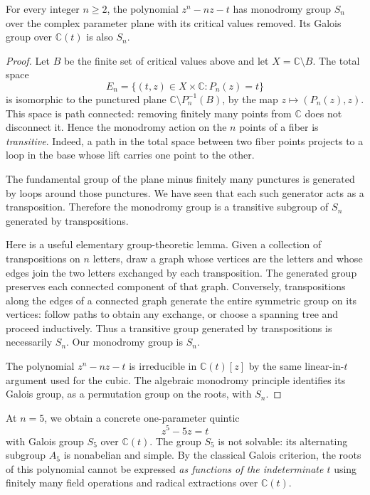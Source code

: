 \begin{theorem}
For every integer \(n\ge2\), the polynomial \(z^n-nz-t\) has monodromy group \(S_n\) over the complex parameter plane with its critical values removed. Its Galois group over \(\mathbb C(t)\) is also \(S_n\).
\end{theorem}

\begin{proof}
Let \(B\) be the finite set of critical values above and let \(X=\mathbb C\setminus B\). The total space
\[
 E_n=\{(t,z)\in X\times\mathbb C:P_n(z)=t\}
\]
is isomorphic to the punctured plane \(\mathbb C\setminus P_n^{-1}(B)\), by the map \(z\mapsto(P_n(z),z)\). This space is path connected: removing finitely many points from \(\mathbb C\) does not disconnect it. Hence the monodromy action on the \(n\) points of a fiber is \emph{transitive}. Indeed, a path in the total space between two fiber points projects to a loop in the base whose lift carries one point to the other.

The fundamental group of the plane minus finitely many punctures is generated by loops around those punctures. We have seen that each such generator acts as a transposition. Therefore the monodromy group is a transitive subgroup of \(S_n\) generated by transpositions.

Here is a useful elementary group-theoretic lemma. Given a collection of transpositions on \(n\) letters, draw a graph whose vertices are the letters and whose edges join the two letters exchanged by each transposition. The generated group preserves each connected component of that graph. Conversely, transpositions along the edges of a connected graph generate the entire symmetric group on its vertices: follow paths to obtain any exchange, or choose a spanning tree and proceed inductively. Thus a transitive group generated by transpositions is necessarily \(S_n\). Our monodromy group is \(S_n\).

The polynomial \(z^n-nz-t\) is irreducible in \(\mathbb C(t)[z]\) by the same linear-in-\(t\) argument used for the cubic. The algebraic monodromy principle identifies its Galois group, as a permutation group on the roots, with \(S_n\).
\end{proof}

At \(n=5\), we obtain a concrete one-parameter quintic
\[
 z^5-5z=t
\]
with Galois group \(S_5\) over \(\mathbb C(t)\). The group \(S_5\) is not solvable: its alternating subgroup \(A_5\) is nonabelian and simple. By the classical Galois criterion, the roots of this polynomial cannot be expressed \emph{as functions of the indeterminate \(t\)} using finitely many field operations and radical extractions over \(\mathbb C(t)\).

